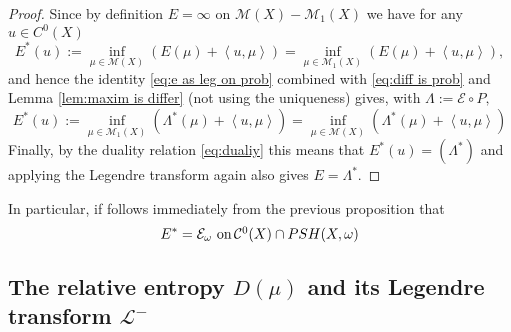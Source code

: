 \documentclass[11pt,oneside,english]{amsart}
\numberwithin{equation}{section}
\numberwithin{figure}{section}
\theoremstyle{plain}
\theoremstyle{plain}
\theoremstyle{plain}
\theoremstyle{plain}
\theoremstyle{remark}
\theoremstyle{definition}
\begin{document}
\begin{proof}
Since by definition $E=\infty$ on $\mathcal{M}(X)-\mathcal{M}_{1}(X)$
we have for any $u\in C^{0}(X)$ 
\[
E^{*}(u):=\inf_{\mu\in\mathcal{M}(X)}(E(\mu)+\left\langle u,\mu\right\rangle )=\inf_{\mu\in\mathcal{M}_{1}(X)}(E(\mu)+\left\langle u,\mu\right\rangle ),
\]
 and hence the identity \ref{eq:e as leg on prob} combined with \ref{eq:diff is prob}
and Lemma \ref{lem:maxim is differ} (not using the uniqueness) gives,
with $\Lambda:=\mathcal{E}\circ P,$ 
\[
E^{*}(u):=\inf_{\mu\in\mathcal{M}_{1}(X)}(\Lambda^{*}(\mu)+\left\langle u,\mu\right\rangle )=\inf_{\mu\in\mathcal{M}(X)}(\Lambda^{*}(\mu)+\left\langle u,\mu\right\rangle )
\]
 Finally, by the duality relation \ref{eq:dualiy} this means that
$E^{*}(u)=(\Lambda^{*})$ and applying the Legendre transform again
also gives $E=\Lambda^{*}.$ 
\end{proof}
In particular, if follows immediately from the previous proposition
that 
\[
E^{*}=\mathcal{E_{\omega}}\,\,\mbox{on\,\ensuremath{\mathcal{C}^{0}(X)\cap PSH(X,\omega)}}
\]

\subsection{\emph{\label{sub:The-relative-entropy}}The relative entropy $D(\mu)$
and its Legendre transform $\mathcal{L}^{-}$}
\end{document}
